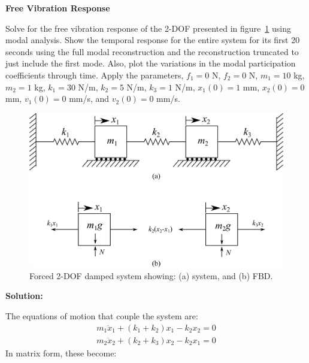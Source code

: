 \documentclass[12pt,letter]{article}
\begin{document}
	\begin{example}
	\textbf{Free Vibration Response}
	
	\noindent Solve for the free vibration response of the 2-DOF presented in figure~\ref{fig:2-DOF-spring_mass_horizontal_double_wall} using modal analysis. Show the temporal response for the entire system for its first 20 seconds using the full modal reconstruction and the reconstruction truncated to just include the first mode. Also, plot the variations in the modal participation coefficients through time. Apply the parameters, $f_1 = 0$ N, $f_2 = 0$ N, $m_1 = 10$ kg, $m_2 = 1$ kg, $k_1 = 30$ N/m, $k_2 = 5$ N/m, $k_3 = 1$ N/m, $x_1(0) = 1$ mm, $x_2(0) = 0$ mm, $v_1(0) = 0$ mm/s, and $v_2(0) = 0$ mm/s.
	
	\begin{figure}[H]
		\centering
		\includegraphics[]{../figures/2-DOF-spring_mass_horizontal_double_wall.png}
		\caption{Forced 2-DOF damped system showing: (a) system, and (b) FBD.}
		\label{fig:2-DOF-spring_mass_horizontal_double_wall}
	\end{figure}

\noindent \textbf{Solution:} 

\noindent The equations of motion that couple the system are:
	\begin{eqnarray}
	m_1\ddot{x}_1 + (k_1+k_2)x_1 - k_2x_2 = 0 \\
	m_2\ddot{x}_2 + (k_2+k_3)x_2 - k_2x_1 = 0 \nonumber
	\end{eqnarray}
	In matrix form, these become:
	

\end{example}
\end{document}
